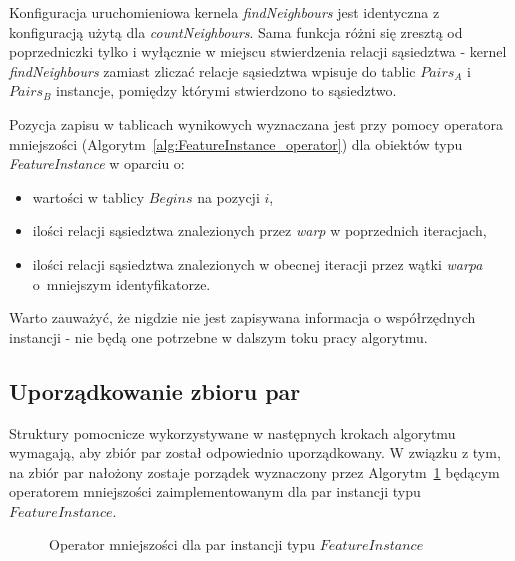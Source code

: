\documentclass[12pt]{article}
\begin{document}
Konfiguracja uruchomieniowa kernela \textit{findNeighbours} jest identyczna z konfiguracją użytą dla \textit{countNeighbours}. Sama funkcja różni się zresztą od poprzedniczki tylko i wyłącznie w miejscu stwierdzenia relacji sąsiedztwa - kernel \textit{findNeighbours} zamiast zliczać relacje sąsiedztwa wpisuje do tablic $ Pairs_{A} $ i $ Pairs_{B}$ instancje, pomiędzy którymi stwierdzono to sąsiedztwo. 

Pozycja zapisu w tablicach wynikowych wyznaczana jest przy pomocy operatora mniejszości (Algorytm~\ref{alg:FeatureInstance_operator}) dla obiektów typu \textit{FeatureInstance} w oparciu o:

\begin{itemize}
\item wartości w tablicy $ Begins $ na pozycji $i$,
\item ilości relacji sąsiedztwa znalezionych przez \textit{warp} w poprzednich iteracjach,
\item ilości relacji sąsiedztwa znalezionych w obecnej iteracji przez wątki \textit{warpa} o~mniejszym identyfikatorze. 
\end{itemize}

Warto zauważyć, że nigdzie nie jest zapisywana informacja o współrzędnych instancji - nie będą one potrzebne w dalszym toku pracy algorytmu.

\subsection{Uporządkowanie zbioru par}
\label{subsec:pair_ordering}

Struktury pomocnicze wykorzystywane w następnych krokach algorytmu wymagają, aby zbiór par został odpowiednio uporządkowany. W związku z tym, na zbiór par nałożony zostaje porządek wyznaczony przez Algorytm~\ref{alg:FeatureInstancePair-operator} będącym operatorem mniejszości zaimplementowanym dla par instancji typu $ FeatureInstance $.

\begin{figure}[H]
\begin{algorithm}[H]
\caption{Operator mniejszości dla par instancji typu $ FeatureInstance $}
\label{alg:FeatureInstancePair-operator}
\end{algorithm}
\end{figure}
\end{document}
